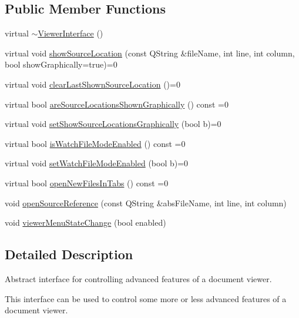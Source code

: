 \subsection*{Public Member Functions}
\begin{DoxyCompactItemize}
\item 
virtual \hyperlink{classOkular_1_1ViewerInterface_a98227c28cd91eb8c4c24da44ea45fc2b}{$\sim$\+Viewer\+Interface} ()
\item 
virtual void \hyperlink{classOkular_1_1ViewerInterface_a79b9a9f9f84c821bb8184a7286adb204}{show\+Source\+Location} (const Q\+String \&file\+Name, int line, int column, bool show\+Graphically=true)=0
\item 
virtual void \hyperlink{classOkular_1_1ViewerInterface_a7996499c3ec15370a86ece0fceeaf3e4}{clear\+Last\+Shown\+Source\+Location} ()=0
\item 
virtual bool \hyperlink{classOkular_1_1ViewerInterface_ade4fd31254f46eec6c4022e9f6f0c110}{are\+Source\+Locations\+Shown\+Graphically} () const =0
\item 
virtual void \hyperlink{classOkular_1_1ViewerInterface_a86f6a5c7606647f3b0ce361b2466b601}{set\+Show\+Source\+Locations\+Graphically} (bool b)=0
\item 
virtual bool \hyperlink{classOkular_1_1ViewerInterface_aba6411f2363a8bfef5a791e26d16b6c8}{is\+Watch\+File\+Mode\+Enabled} () const =0
\item 
virtual void \hyperlink{classOkular_1_1ViewerInterface_ac1dc8abfc492ded23720603bbabaebc4}{set\+Watch\+File\+Mode\+Enabled} (bool b)=0
\item 
virtual bool \hyperlink{classOkular_1_1ViewerInterface_afc775f348f3ac69f40ab37e790bacf97}{open\+New\+Files\+In\+Tabs} () const =0
\item 
void \hyperlink{classOkular_1_1ViewerInterface_a5c7f6d06a99b6725861a3f3d64441052}{open\+Source\+Reference} (const Q\+String \&abs\+File\+Name, int line, int column)
\item 
void \hyperlink{classOkular_1_1ViewerInterface_a00d8b2b0dae0db71c9cab95f0e757e8e}{viewer\+Menu\+State\+Change} (bool enabled)
\end{DoxyCompactItemize}


\subsection{Detailed Description}
Abstract interface for controlling advanced features of a document viewer. 

This interface can be used to control some more or less advanced features of a document viewer. 

